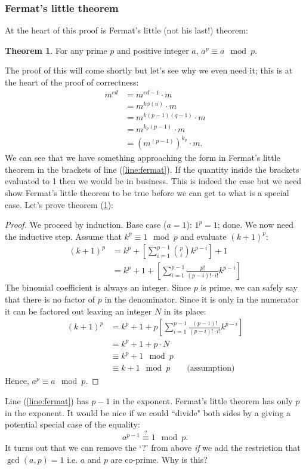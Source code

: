 \documentclass[]{scrartcl}
\theoremstyle{definition}
\newtheorem{thm}{Theorem}
\let\oldref\ref
\renewcommand{\ref}[1]{(\oldref{#1})}
\begin{document}
\subsubsection{Fermat's little theorem}
At the heart of this proof is Fermat's little (not his last!) theorem:
\begin{thm}\label{thm:fermat}
    For any prime $p$ and positive integer $a$, $a^p \equiv a \mod p$.
\end{thm}
The proof of this will come shortly but let's see why we even need it; this is at the heart of the proof of correctness:
\begin{align}
m^{ed}&=m^{ed-1}\cdot m \\
      &=m^{k\phi(n)}\cdot m  \\
      &=m^{k(p-1)(q-1)}\cdot m  \\
      &=m^{k_p(p-1)}\cdot m  \\
      &=\left(m^{(p-1)}\right)^{k_p}\cdot m . \label{line:fermat}
\end{align}
We can see that we have something approaching the form in Fermat's little theorem in the brackets of line \ref{line:fermat}. If the quantity inside the brackets evaluated to 1 then we would be in business. This is indeed the case but we need show Fermat's little theorem to be true before we can get to what is a special case. Let's prove theorem \ref{thm:fermat}:
\begin{proof}
    We proceed by induction. Base case ($a=1$): $1^p = 1$; done. We now need the inductive step. Assume that $k^p \equiv 1 \mod p$ and evaluate $(k+1)^p$:
    \begin{align*}
        (k + 1)^p &=k^p + \left[\sum_{i=1}^{p-1} \binom{p}{i}k^{p-i}\right] + 1 \\
                  &=k^p + 1 + \left[\sum_{i=1}^{p-1} \frac{p!}{(p-i)!\cdot i!}k^{p-i}\right]
    \end{align*}
    The binomial coefficient is always an integer. Since $p$ is prime, we can safely say that there is no factor of $p$ in the denominator. Since it is only in the numerator it can be factored out leaving an integer $N$ in its place:
    \begin{align*}
        (k + 1)^p &=k^p + 1 + p\left[\sum_{i=1}^{p-1} \frac{(p-1)!}{(p-i)!\cdot i!}k^{p-i}\right] \\
                  &=k^p + 1 + p \cdot N \\
                  &\equiv k^p + 1 \mod p \\
                  &\equiv k + 1 \mod p\qquad \textrm{(assumption)}
    \end{align*}
    Hence, $a^p \equiv a \mod p$.
\end{proof}
Line \ref{line:fermat} has $p-1$ in the exponent. Fermat's little theorem has only $p$ in the exponent. It would be nice if we could ``divide" both sides by a giving a potential special case of the equality:
\begin{equation}\label{eqn:fermat-special}
    a^{p-1} \overset{?}{\equiv} 1 \mod p.
\end{equation}
It turns out that we can remove the `?' from above \textit{if} we add the restriction that $\gcd(a, p) = 1$ i.e. $a$ and $p$ are co-prime. Why is this?
\end{document}
